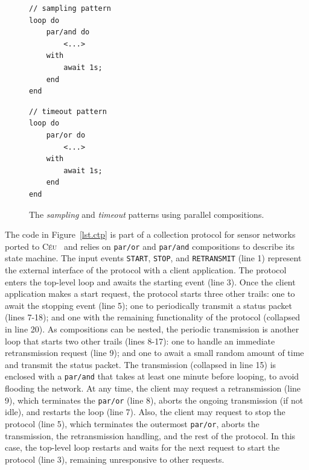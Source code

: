 \documentclass{acm_proc_article-sp}
\newcommand{\CEU}{\textsc{C\'{e}u}\xspace}
\newcommand{\code}[1] {{\small{\texttt{#1}}}}
\newcommand{\1}{\;}
\newcommand{\2}{\;\;}
\newcommand{\3}{\;\;\;}
\newcommand{\5}{\;\;\;\;\;}
\begin{document}
\begin{figure}[t]
\begin{minipage}[t]{0.40\linewidth}
\begin{lstlisting}
// sampling pattern
loop do
    par/and do
        <...>
    with
        await 1s;
    end
end
\end{lstlisting}
\end{minipage}
%
\begin{minipage}[t]{0.40\linewidth}
\begin{lstlisting}
// timeout pattern
loop do
    par/or do
        <...>
    with
        await 1s;
    end
end
\end{lstlisting}
\end{minipage}
\caption{ The \emph{sampling} and \emph{timeout} patterns using parallel 
compositions.
\label{lst.patts}
}
\end{figure}

The code in Figure~\ref{lst.ctp} is part of a collection protocol for sensor 
networks ported to \CEU~\cite{wsn.ctp,ceu.sensys13} and relies on \code{par/or} 
and \code{par/and} compositions to describe its state machine.
%
The input events \code{START}, \code{STOP}, and \code{RETRANSMIT} (line 1) 
represent the external interface of the protocol with a client application.
%
The protocol enters the top-level loop and awaits the starting event (line 3).
Once the client application makes a start request, the protocol starts three 
other trails:
one to await the stopping event (line 5);
one to periodically transmit a status packet (lines 7-18);
and one with the remaining functionality of the protocol (collapsed in line 
20).
%
As compositions can be nested, the periodic transmission is another loop that 
starts two other trails (lines 8-17):
one to handle an immediate retransmission request (line 9);
and one to await a small random amount of time and transmit the status packet.
%
The transmission (collapsed in line 15) is enclosed with a \code{par/and} that 
takes at least one minute before looping, to avoid flooding the network.
%
At any time, the client may request a retransmission (line 9), which terminates 
the \code{par/or} (line 8), aborts the ongoing transmission (if not idle), and 
restarts the loop (line 7).
%
Also, the client may request to stop the protocol (line 5), which terminates 
the outermost \code{par/or}, aborts the transmission, the retransmission 
handling, and the rest of the protocol.
In this case, the top-level loop restarts and waits for the next request to 
start the protocol (line 3), remaining unresponsive to other requests.
\end{document}
